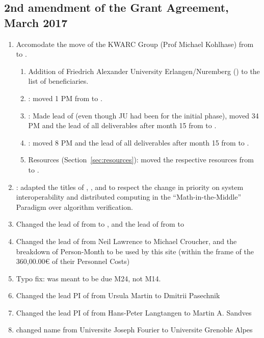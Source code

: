 \subsection*{2nd amendment of the Grant Agreement, March 2017}
\begin{enumerate}
\item Accomodate the move of the KWARC Group (Prof Michael Kohlhase) from  to
  . 
\begin{enumerate}
\item Addition of Friedrich Alexander University Erlangen/Nuremberg () to the
  list of beneficiaries.
\item {}: moved 1 PM from  to .
\item {}: Made  lead of  (even though JU had been
  for the initial phase), moved 34 PM and the lead of all deliverables after month 15 from
   to .
\item {}: moved 8 PM and the lead of all deliverables after month 15 from
   to . 
\item Resources (Section~\ref{sec:resources}): moved the respective resources from
   to .
\end{enumerate}
\item {}: adapted the titles of ,
  , and  to respect the change in
  priority on system interoperability and distributed computing in the
  ``Math-in-the-Middle'' Paradigm over algorithm verification. 
\item Changed the lead of 
  from  to , and the lead of  from  to 
\item Changed the lead of  from Neil Lawrence to Michael Croucher, and the breakdown 
of Person-Month to be used by this site (within the frame of the 360,00.00€ of their Personnel Costs)
\item Typo fix:  was meant to be due M24, not M14.
\item Changed the lead PI of  from Ursula Martin to Dmitrii Pasechnik
\item Changed the lead PI of  from Hans-Peter Langtangen to Martin A. Sandves
\item {} changed name from Universite Joseph Fourier to Universite Grenoble Alpes

\end{enumerate}
